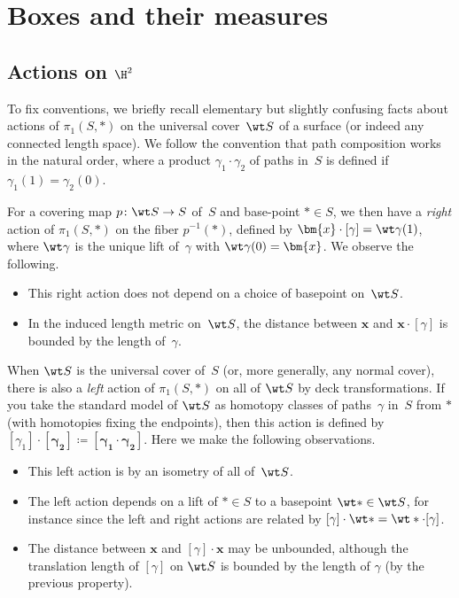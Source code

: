 \section{Boxes and their measures}

\subsection{Actions on $\H^2$}
\label{sec:actions}

To fix conventions, we briefly recall elementary but slightly
confusing facts about actions of $\pi_1(S,\ast)$ on the universal
cover~$\wt S$ of a surface (or indeed any connected length space). We
follow the convention that path composition works in the natural
order, where a product $\gamma_1 \cdot \gamma_2$ of paths in~$S$ is
defined if $\gamma_1(1) = \gamma_2(0)$.

For a covering map $p \colon \wt S \to S$ of~$S$ and base-point
$\ast \in S$, we then have a \emph{right} action of $\pi_1(S,\ast)$ on
the fiber $p^{-1}(\ast)$, defined by
$\bm{x}\cdot[\gamma] = \wt \gamma(1)$, where $\wt\gamma$ is the
unique lift of~$\gamma$ with $\wt\gamma(0) = \bm{x}$. We observe
the following.
\begin{itemize}
\item This right action does not depend on a choice of basepoint
  on~$\wt S$.
\item In the induced length metric on~$\wt S$, the distance between
  $\bm{x}$ and $\bm{x}\cdot [\gamma]$ is bounded by the length of~$\gamma$.
\end{itemize}

When $\wt S$ is the universal cover of~$S$ (or, more generally, any
normal cover), there is also a \emph{left} action of $\pi_1(S,\ast)$
on all of $\wt S$ by deck transformations. If you take
the standard model of $\wt S$ as homotopy classes of paths~$\gamma$
in~$S$ from $\ast$ (with homotopies fixing the endpoints), then this
action is defined by
$[\gamma_1] \cdot \bm{[\gamma_2]} \coloneqq
\bm{[\gamma_1\cdot\gamma_2]}$. Here we make the following observations.
\begin{itemize}
\item This left action is by an isometry of all of~$\wt S$.
\item The left action depends on a lift of
  $\ast \in S$ to a basepoint  $\wt \ast \in \wt S$, for instance
  since the left and right actions are
  related by $[\gamma] \cdot \wt \ast = \wt \ast \cdot [\gamma]$.
\item The distance between $\bm{x}$ and $[\gamma] \cdot \bm{x}$
  may be unbounded, although the translation length of $[\gamma]$ on
  $\wt S$ is bounded by the length of $\gamma$ (by the previous property).
\end{itemize}

